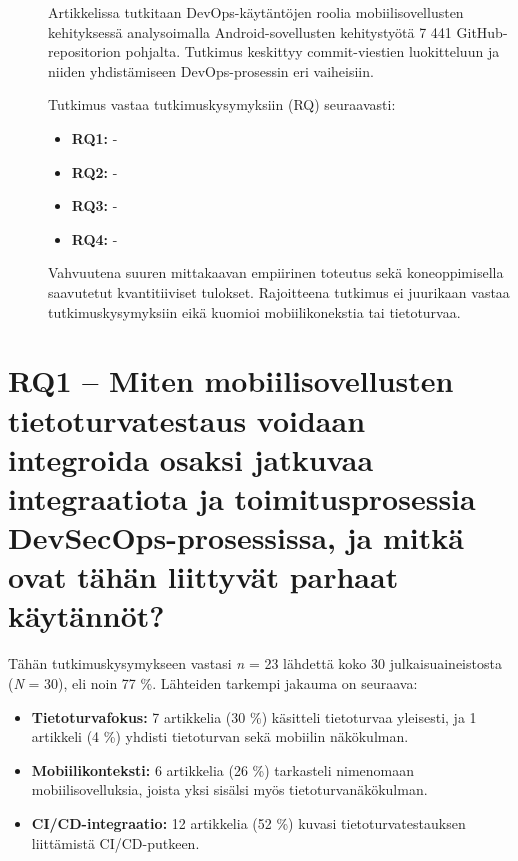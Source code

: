 \documentclass[bscthesis,finnish,oneside,biblatex]{uefcsthesis}
\begin{document}
\begin{description}
    \item[\cite{eramo2024empirical}] Artikkelissa tutkitaan DevOps-käytäntöjen roolia mobiilisovellusten kehityksessä analysoimalla Android-sovellusten kehitystyötä 7 441 GitHub-repositorion pohjalta. Tutkimus keskittyy commit-viestien luokitteluun ja niiden yhdistämiseen DevOps-prosessin eri vaiheisiin.

    Tutkimus vastaa tutkimuskysymyksiin (RQ) seuraavasti:
    \begin{itemize}
        \item \textbf{RQ1:} -
        \item \textbf{RQ2:} -
        \item \textbf{RQ3:} -
        \item \textbf{RQ4:} -
    \end{itemize}

    Vahvuutena suuren mittakaavan empiirinen toteutus sekä koneoppimisella saavutetut kvantitiiviset tulokset. Rajoitteena tutkimus ei juurikaan vastaa tutkimuskysymyksiin eikä kuomioi mobiilikonekstia tai tietoturvaa.
\end{description}

\section{RQ1 – Miten mobiilisovellusten tietoturvatestaus voidaan integroida osaksi jatkuvaa integraatiota ja toimitusprosessia DevSecOps-prosessissa, ja mitkä ovat tähän liittyvät parhaat käytännöt?}
\label{sec:rq1}

Tähän tutkimuskysymykseen vastasi \emph{n} = 23 lähdettä koko
30 julkaisu\-aineistosta (\emph{N} = 30), eli noin 77 \%.
Lähteiden tarkempi jakauma on seuraava:

\begin{itemize}
  \item \textbf{Tietoturva­fokus:} 7 artikkelia (30 \%) käsitteli
        tietoturvaa yleisesti, ja 1 artikkeli (4 \%) yhdisti
        tietoturvan sekä mobiilin näkökulman.
  \item \textbf{Mobiili­konteksti:} 6 artikkelia (26 \%)
        tarkasteli nimenomaan mobiilisovelluksia,
        joista yksi sisälsi myös tietoturvanäkökulman.
  \item \textbf{CI/CD-integraatio:} 12 artikkelia (52 \%)
        kuvasi tietoturvatestauksen liittämistä
        CI/CD-putkeen.
\end{itemize}
\end{document}

